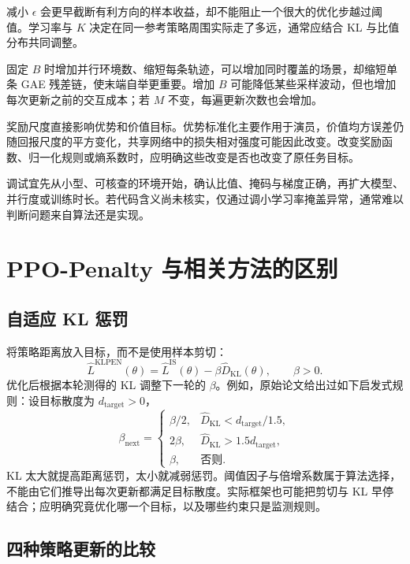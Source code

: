 \documentclass[UTF8]{ctexart}
\begin{document}
减小 $\epsilon$ 会更早截断有利方向的样本收益，却不能阻止一个很大的优化步越过阈值。学习率与 $K$ 决定在同一参考策略周围实际走了多远，通常应结合 KL 与比值分布共同调整。

固定 $B$ 时增加并行环境数、缩短每条轨迹，可以增加同时覆盖的场景，却缩短单条 GAE 残差链，使末端自举更重要。增加 $B$ 可能降低某些采样波动，但也增加每次更新之前的交互成本；若 $M$ 不变，每遍更新次数也会增加。

奖励尺度直接影响优势和价值目标。优势标准化主要作用于演员，价值均方误差仍随回报尺度的平方变化，共享网络中的损失相对强度可能因此改变。改变奖励函数、归一化规则或熵系数时，应明确这些改变是否也改变了原任务目标。

调试宜先从小型、可核查的环境开始，确认比值、掩码与梯度正确，再扩大模型、并行度或训练时长。若代码含义尚未核实，仅通过调小学习率掩盖异常，通常难以判断问题来自算法还是实现。

\section{PPO-Penalty 与相关方法的区别}
\label{sec:ppo-variants}

\subsection{自适应 KL 惩罚}

 将策略距离放入目标，而不是使用样本剪切：
\begin{equation}
  \widehat L^{\mathrm{KLPEN}}(\theta)
  =\widehat L^{\mathrm{IS}}(\theta)
   -\beta\widehat D_{\mathrm{KL}}(\theta),
  \qquad \beta>0.
  \label{eq:ppo-penalty}
\end{equation}
优化后根据本轮测得的 KL 调整下一轮的 $\beta$。例如，原始论文给出过如下启发式规则\cite{schulman-ppo}：设目标散度为 $d_{\mathrm{target}}>0$，
\[
  \beta_{\mathrm{next}}=
  \begin{cases}
    \beta/2,&\widehat D_{\mathrm{KL}}<d_{\mathrm{target}}/1.5,\\
    2\beta,&\widehat D_{\mathrm{KL}}>1.5d_{\mathrm{target}},\\
    \beta,&\text{否则}.
  \end{cases}
\]
KL 太大就提高距离惩罚，太小就减弱惩罚。阈值因子与倍增系数属于算法选择，不能由它们推导出每次更新都满足目标散度。实际框架也可能把剪切与 KL 早停结合；应明确究竟优化哪一个目标，以及哪些约束只是监测规则。

\subsection{四种策略更新的比较}
\end{document}
